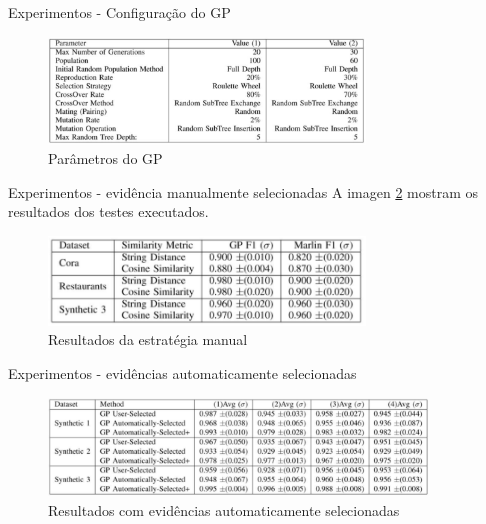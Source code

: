 \documentclass{beamer}
\begin{document}
  \begin{frame}{Experimentos - Configuração do GP}

      \begin{figure}
          \centering
          \includegraphics[width=0.75\textwidth]{parametrosga.png}
          \caption{Parâmetros do GP\cite{geneticrl}}
          \label{fig:param}
      \end{figure}
  \end{frame}

  \begin{frame}{Experimentos - evidência manualmente selecionadas}
      A imagen \ref{fig:tbl1} mostram os resultados dos testes executados.
      \begin{figure}
          \centering
          \includegraphics[width=0.75\textwidth]{resultados-manuais.png}
          \caption{Resultados da estratégia manual \cite{geneticrl}}
          \label{fig:tbl1}
      \end{figure}
  \end{frame}

  \begin{frame}{Experimentos - evidências automaticamente selecionadas}
      \begin{figure}
          \centering
          \includegraphics[width=0.9\textwidth]{resultados-automaticos.png}
          \caption{Resultados com evidências automaticamente selecionadas \cite{geneticrl}}
          \label{fig:resultados-automaticos}
      \end{figure}
  \end{frame}
\end{document}
